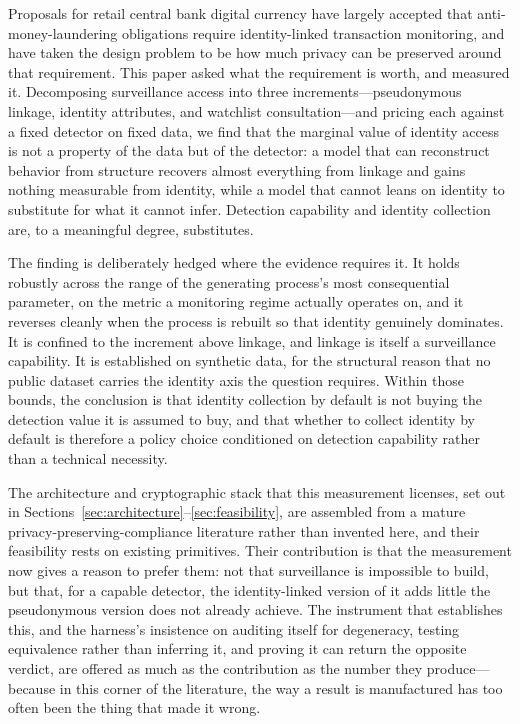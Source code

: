 \documentclass[11pt]{article}
\begin{document}
Proposals for retail central bank digital currency have largely accepted that anti-money-laundering
obligations require identity-linked transaction monitoring, and have taken the design problem to be
how much privacy can be preserved around that requirement. This paper asked what the requirement is
worth, and measured it. Decomposing surveillance access into three increments---pseudonymous linkage,
identity attributes, and watchlist consultation---and pricing each against a fixed detector on fixed
data, we find that the marginal value of identity access is not a property of the data but of the
detector: a model that can reconstruct behavior from structure recovers almost everything from
linkage and gains nothing measurable from identity, while a model that cannot leans on identity to
substitute for what it cannot infer. Detection capability and identity collection are, to a
meaningful degree, substitutes.

The finding is deliberately hedged where the evidence requires it. It holds robustly across the range
of the generating process's most consequential parameter, on the metric a monitoring regime actually
operates on, and it reverses cleanly when the process is rebuilt so that identity genuinely dominates.
It is confined to the increment above linkage, and linkage is itself a surveillance capability. It is
established on synthetic data, for the structural reason that no public dataset carries the identity
axis the question requires. Within those bounds, the conclusion is that identity collection by default
is not buying the detection value it is assumed to buy, and that whether to collect identity by
default is therefore a policy choice conditioned on detection capability rather than a technical
necessity.

The architecture and cryptographic stack that this measurement licenses, set out in
Sections~\ref{sec:architecture}--\ref{sec:feasibility}, are assembled from a mature
privacy-preserving-compliance literature rather than invented here, and their feasibility rests on
existing primitives. Their contribution is that the measurement now gives a reason to prefer them:
not that surveillance is impossible to build, but that, for a capable detector, the identity-linked
version of it adds little the pseudonymous version does not already achieve. The instrument that
establishes this, and the harness's insistence on auditing itself for degeneracy, testing equivalence
rather than inferring it, and proving it can return the opposite verdict, are offered as much as the
contribution as the number they produce---because in this corner of the literature, the way a result
is manufactured has too often been the thing that made it wrong.
\end{document}
